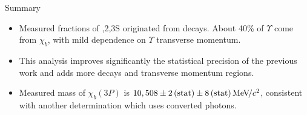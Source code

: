 \begin{frame}{Summary}

\begin{itemize}
\item Measured fractions of ,2,3S originated from \chib decays.
About 40\% of $\Upsilon$ come from $\chi_b$, with mild dependence on $\Upsilon$ transverse momentum.
\item This analysis improves significantly the statistical precision of the previous work and 
adds more decays and transverse momentum regions.
\item Measured mass of $\chi_b(3P)$ is $10{,508}\pm2\mathrm{\,(stat)}\pm8\mathrm{\,(stat)}{\mathrm{\,Me\kern -0.1em V\!/}c^2}$, consistent with another determination which uses converted photons.
\end{itemize}


\end{frame}